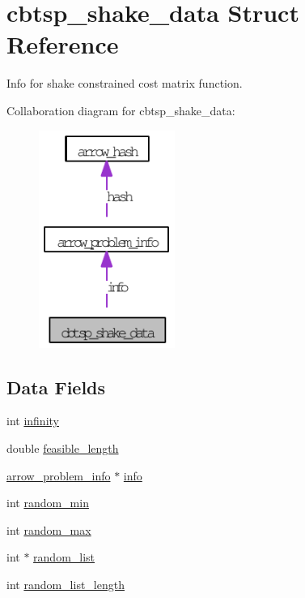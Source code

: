 \hypertarget{structcbtsp__shake__data}{
\section{cbtsp\_\-shake\_\-data Struct Reference}
\label{structcbtsp__shake__data}
}
Info for shake constrained cost matrix function.  


Collaboration diagram for cbtsp\_\-shake\_\-data:\nopagebreak
\begin{figure}[H]
\begin{center}
\leavevmode
\includegraphics[width=126pt]{structcbtsp__shake__data__coll__graph}
\end{center}
\end{figure}
\subsection*{Data Fields}
\begin{CompactItemize}
\item 
int \hyperlink{structcbtsp__shake__data_0027814ba0f0f76f91e7169d0486897f}{infinity}
\item 
double \hyperlink{structcbtsp__shake__data_651c45c37eee045a6bcea8963955edd6}{feasible\_\-length}
\item 
\hyperlink{structarrow__problem__info}{arrow\_\-problem\_\-info} $\ast$ \hyperlink{structcbtsp__shake__data_3d2c2d5951d6245419346509f328720b}{info}
\item 
int \hyperlink{structcbtsp__shake__data_88e2f84442dd2fb0cfdf548de45dd4a2}{random\_\-min}
\item 
int \hyperlink{structcbtsp__shake__data_c60975938eff642adfafd228b666d536}{random\_\-max}
\item 
int $\ast$ \hyperlink{structcbtsp__shake__data_325d0115e7fe18f7fede7e164e6f6d8f}{random\_\-list}
\item 
int \hyperlink{structcbtsp__shake__data_20b4fd190a23a1a0cb3e869716d2af3f}{random\_\-list\_\-length}
\end{CompactItemize}


